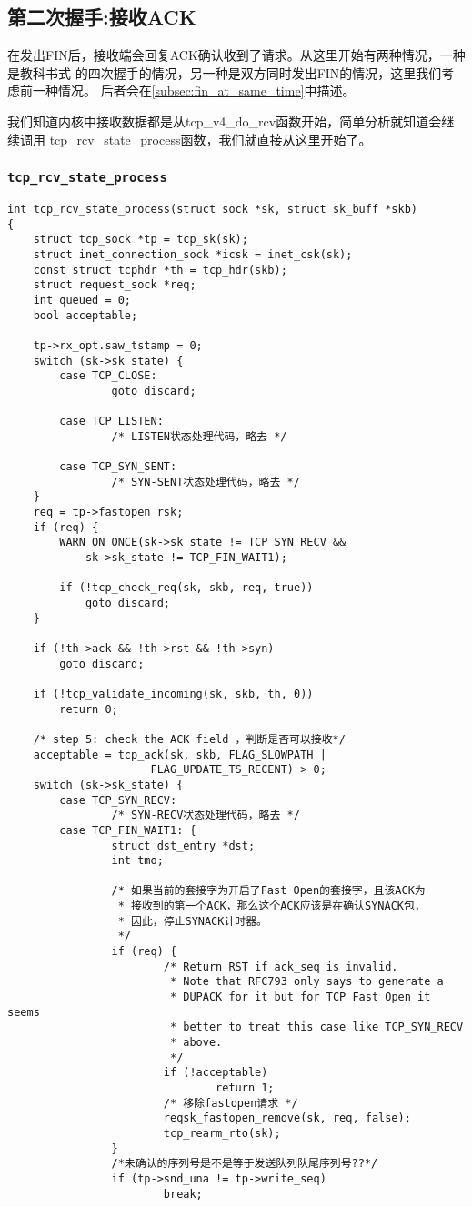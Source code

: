 	\subsection{第二次握手:接收ACK}
		在发出FIN后，接收端会回复ACK确认收到了请求。从这里开始有两种情况，一种是教科书式
		的四次握手的情况，另一种是双方同时发出FIN的情况，这里我们考虑前一种情况。
		后者会在\ref{subsec:fin_at_same_time}中描述。
		
		我们知道内核中接收数据都是从tcp\_v4\_do\_rcv函数开始，简单分析就知道会继续调用
		tcp\_rcv\_state\_process函数，我们就直接从这里开始了。
		\subsubsection{\texttt{tcp_rcv_state_process}}
			\label{ClientReceiveACK:tcp_rcv_state_process}
\begin{verbatim}
int tcp_rcv_state_process(struct sock *sk, struct sk_buff *skb)
{
	struct tcp_sock *tp = tcp_sk(sk);
	struct inet_connection_sock *icsk = inet_csk(sk);
	const struct tcphdr *th = tcp_hdr(skb);
	struct request_sock *req;
	int queued = 0;
	bool acceptable;

	tp->rx_opt.saw_tstamp = 0;
	switch (sk->sk_state) {
		case TCP_CLOSE:
		        goto discard;

		case TCP_LISTEN:
		        /* LISTEN状态处理代码，略去 */

		case TCP_SYN_SENT:
		        /* SYN-SENT状态处理代码，略去 */
	}
	req = tp->fastopen_rsk;
	if (req) {
		WARN_ON_ONCE(sk->sk_state != TCP_SYN_RECV &&
		    sk->sk_state != TCP_FIN_WAIT1);

		if (!tcp_check_req(sk, skb, req, true))
			goto discard;
	}

	if (!th->ack && !th->rst && !th->syn)
		goto discard;

	if (!tcp_validate_incoming(sk, skb, th, 0))
		return 0;

	/* step 5: check the ACK field ，判断是否可以接收*/
	acceptable = tcp_ack(sk, skb, FLAG_SLOWPATH |
				      FLAG_UPDATE_TS_RECENT) > 0;
	switch (sk->sk_state) {
		case TCP_SYN_RECV:
		        /* SYN-RECV状态处理代码，略去 */
		case TCP_FIN_WAIT1: {
		        struct dst_entry *dst;
		        int tmo;

		        /* 如果当前的套接字为开启了Fast Open的套接字，且该ACK为
		         * 接收到的第一个ACK，那么这个ACK应该是在确认SYNACK包，
		         * 因此，停止SYNACK计时器。
		         */
		        if (req) {
		                /* Return RST if ack_seq is invalid.
		                 * Note that RFC793 only says to generate a
		                 * DUPACK for it but for TCP Fast Open it seems
		                 * better to treat this case like TCP_SYN_RECV
		                 * above.
		                 */
		                if (!acceptable)
		                        return 1;
		                /* 移除fastopen请求 */
		                reqsk_fastopen_remove(sk, req, false);
		                tcp_rearm_rto(sk);
		        }
				/*未确认的序列号是不是等于发送队列队尾序列号??*/
		        if (tp->snd_una != tp->write_seq)
		                break;


\end{verbatim}
